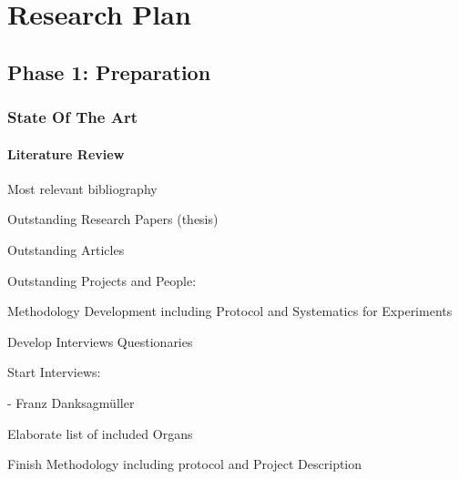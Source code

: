 \chapter{Research Plan}



 






\section{Phase 1: Preparation}

\subsection{State Of The Art}

\subsubsection{Literature Review}

Most relevant bibliography



Outstanding Research Papers (thesis)

Outstanding Articles

Outstanding Projects and People:


Methodology Development including Protocol and Systematics for Experiments 

Develop Interviews Questionaries

Start Interviews:

- Franz Danksagmüller


Elaborate list of included Organs 

Finish Methodology including protocol and Project Description









